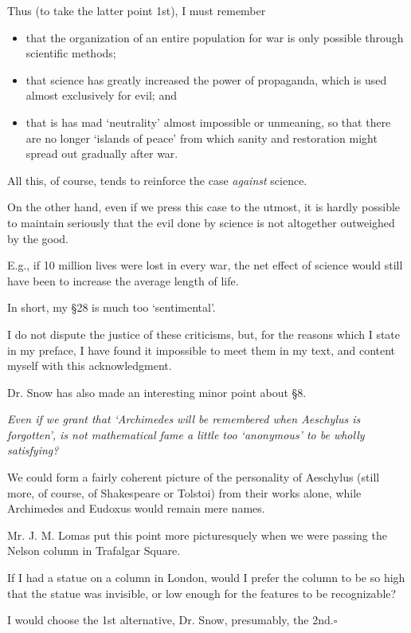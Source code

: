 \documentclass{article}
\numberwithin{equation}{section}
\begin{document}
Thus (to take the latter point 1st), I must remember
\begin{itemize}
    \item[(a)] that the organization of an entire population for war is only possible through scientific methods;
    \item[(b)] that science has greatly increased the power of propaganda, which is used almost exclusively for evil; and
    \item[(c)] that is has mad  `neutrality' almost impossible or unmeaning, so that there are no longer `islands of peace' from which sanity and restoration might spread out gradually after war.
\end{itemize}
All this, of course, tends to reinforce the case \textit{against} science.

On the other hand, even if we press this case to the utmost, it is hardly possible to maintain seriously that the evil done by science is not altogether outweighed by the good.

E.g., if 10 million lives were lost in every war, the net effect of science would still have been to increase the average length of life.

In short, my \S28 is much too `sentimental'.

%
I do not dispute the justice of these criticisms, but, for the reasons which I state in my preface, I have found it impossible to meet them in my text, and content myself with this acknowledgment.

%
Dr. Snow has also made an interesting minor point about \S8.

\textit{Even if we grant that `Archimedes will be remembered when Aeschylus is forgotten', is not mathematical fame a little too `anonymous' to be wholly satisfying?}

We could form a fairly coherent picture of the personality of Aeschylus (still more, of course, of Shakespeare or Tolstoi) from their works alone, while Archimedes and Eudoxus would remain mere names.

%
Mr. J. M. Lomas put this point more picturesquely when we were passing the Nelson column in Trafalgar Square.

If I had a statue on a column in London, would I prefer the column to be so high that the statue was invisible, or low enough for the features to be recognizable?

I would choose the 1st alternative, Dr. Snow, presumably, the 2nd.\hfill$\square$


\printbibliography[heading=bibintoc]
\end{document}
